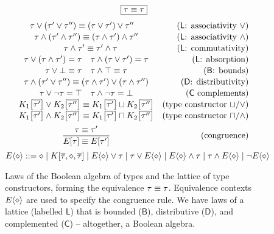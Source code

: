 \begin{figure}
    \centering
    $$ \boxed{\tau \equiv \tau} $$
    $$ \renewcommand\arraystretch{1.1} \begin{array}{cr}
    \tau \join (\tau' \join \tau'') \typeq (\tau \join \tau') \join \tau'' \quad 
    & \text{($\mathsf L$: associativity \mbox{$\join$})}
    \\
    \tau \meet (\tau' \meet \tau'') \typeq (\tau \meet \tau') \meet \tau''
    & \text{($\mathsf L$: associativity \mbox{$\meet$})} 
    \\
    \quad
    \tau \meet \tau' \typeq \tau' \meet \tau 
    & \text{($\mathsf L$: commutativity)}
    \\
    \tau \join (\tau \meet \tau') = \tau
    \quad 
    \tau \meet (\tau \join \tau') = \tau
    & \text{($\mathsf L$: absorption)}
    \\ 
    \tau \join \bot \typeq \tau
    \quad 
    \tau \meet \top \typeq \tau 
    & \text{($\mathsf B$: bounds)} 
    \\
    \tau \meet (\tau' \join \tau'') \typeq (\tau \meet \tau') \join (\tau \meet \tau'')
    & \text{($\mathsf D$: distributivity)}
    \\
    \tau \join \comp \tau = \top 
    \quad
    \tau \meet \comp \tau = \bot
    & \text{($\mathsf C$ complements)} 
    \\ 
    \constr_1\left[\overline {\tau'}\right] \join \constr_2\left[\overline {\tau''}\right] \typeq \constr_1\left[\overline {\tau'}\right] \cjoin \constr_2\left[\overline {\tau''}\right]
    & \text{(type constructor $\cjoin$/$\join$)}
    \\
    \constr_1\left[\overline {\tau'}\right] \meet \constr_2\left[\overline {\tau''}\right] \typeq \constr_1\left[\overline {\tau'}\right] \cmeet \constr_2\left[\overline {\tau''}\right]
    & \text{(type constructor $\cmeet$/$\meet$)}
    \\[0.5em] 
    \dfrac{\tau \typeq \tau'}{E[\tau] \typeq E[\tau']} 
    & \text{(congruence)}
    \end{array} $$
    $$ \equivctx ::= \ctxhole \mid \constr[\overline \tau, \ctxhole, \overline \tau] \mid \equivctx \join \tau \mid \tau \join \equivctx \mid \equivctx \meet \tau \mid \tau \meet \equivctx \mid \comp \equivctx $$
    \caption{Laws of the Boolean algebra of types and the lattice of type constructors, forming the equivalence $\tau \equiv \tau$. Equivalence contexts $\equivctx$ are used to specify the congruence rule. We have laws of a lattice (labelled $\mathsf L$) that is bounded ($\mathsf B$), distributive ($\mathsf D$), and complemented ($\mathsf C$) -- altogether, a Boolean algebra.}
    \label{fig:boolean-laws}
\end{figure}

